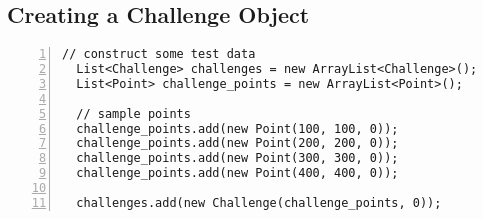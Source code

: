 \documentclass{article} %
\begin{document}
\subsection{Creating a Challenge Object}
\begin{lstlisting}[numbers=left]
  // construct some test data
  List<Challenge> challenges = new ArrayList<Challenge>();
  List<Point> challenge_points = new ArrayList<Point>();

  // sample points
  challenge_points.add(new Point(100, 100, 0));
  challenge_points.add(new Point(200, 200, 0));
  challenge_points.add(new Point(300, 300, 0));
  challenge_points.add(new Point(400, 400, 0));

  challenges.add(new Challenge(challenge_points, 0));
\end{lstlisting}
\end{document}
